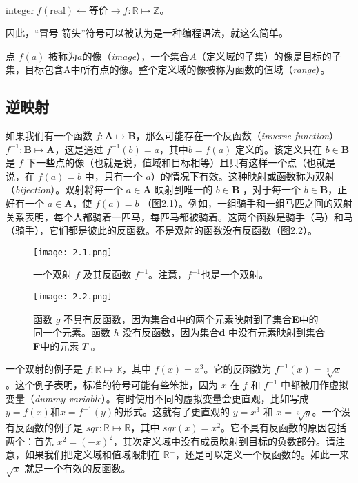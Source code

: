\documentclass[lang=cn,12pt]{elegantbook}
\begin{document}
\begin{center}
  $\text{integer} \  f(\text{real}) \leftarrow \text{等价} \rightarrow f : \mathbb{R} \mapsto \mathbb{Z}。$
\end{center}

因此，“冒号-箭头”符号可以被认为是一种编程语法，就这么简单。

点 $f(a)$ 被称为$a$的像（\textit{image}），一个集合$A$（定义域的子集）的像是目标的子集，目标包含A中所有点的像。整个定义域的像被称为函数的值域（\textit{range}）。

\subsection{逆映射}

如果我们有一个函数 $f : \textbf{A} \mapsto \textbf{B}$，那么可能存在一个反函数（\textit{inverse function}） $f^{-1} : \textbf{B} \mapsto \textbf{A}$，这是通过 $ f^{-1}(b) = a$，其中$b = f(a)$ 定义的。该定义只在 $b \in \textbf{B}$是 $f$ 下一些点的像（也就是说，值域和目标相等）且只有这样一个点（也就是说，在 $f(a) = b$ 中，只有一个 $a$）的情况下有效。这种映射或函数称为双射（\textit{bijection}）。双射将每一个 $a \in \textbf{A}$ 映射到唯一的 $b \in \textbf{B}$ ，对于每一个 $b \in \textbf{B}$，正好有一个 $a \in \textbf{A}$，使 $f(a)=b$ （图2.1）。例如，一组骑手和一组马匹之间的双射关系表明，每个人都骑着一匹马，每匹马都被骑着。这两个函数是骑手（马）和马（骑手），它们都是彼此的反函数。不是双射的函数没有反函数（图2.2）。

\begin{figure}[htb]
\centering
\begin{minipage}[t]{0.4\textwidth}
\centering
\texttt{[image: 2.1.png]}
\caption{一个双射 $f$ 及其反函数 $f^{-1}$。注意，$f^{-1}$也是一个双射。}
\end{minipage}
\hspace*{2em}
\begin{minipage}[t]{0.4\textwidth}
\centering
\texttt{[image: 2.2.png]}
\caption{函数 $g$ 不具有反函数，因为集合\textbf{d}中的两个元素映射到了集合\textbf{E}中的同一个元素。函数 $h$ 没有反函数，因为集合\textbf{d} 中没有元素映射到集合\textbf{F}中的元素 $T$ 。}
\end{minipage}
\end{figure}

一个双射的例子是 $f : \mathbb{R} \mapsto \mathbb{R}$，其中 $f(x) = x^3$。它的反函数为 $f^{-1}(x) = \sqrt[3]{x}$ 。这个例子表明，标准的符号可能有些笨拙，因为 $x$ 在 $f$ 和 $f^{-1}$ 中都被用作虚拟变量（\textit{dummy variable}）。有时使用不同的虚拟变量会更直观，比如写成$y = f(x)$和$x=f^{-1}(y)$的形式。这就有了更直观的 $y = x^3$ 和 $x = \sqrt[3]{y}$。一个没有反函数的例子是 $sqr : \mathbb{R} \mapsto \mathbb{R}$，其中 $sqr(x) = x^2$。它不具有反函数的原因包括两个：首先 $x^2 = (-x)^2$，其次定义域中没有成员映射到目标的负数部分。请注意，如果我们把定义域和值域限制在 $\mathbb{R^+}$，还是可以定义一个反函数的。如此一来 $\sqrt{x}$ 就是一个有效的反函数。
\end{document}

